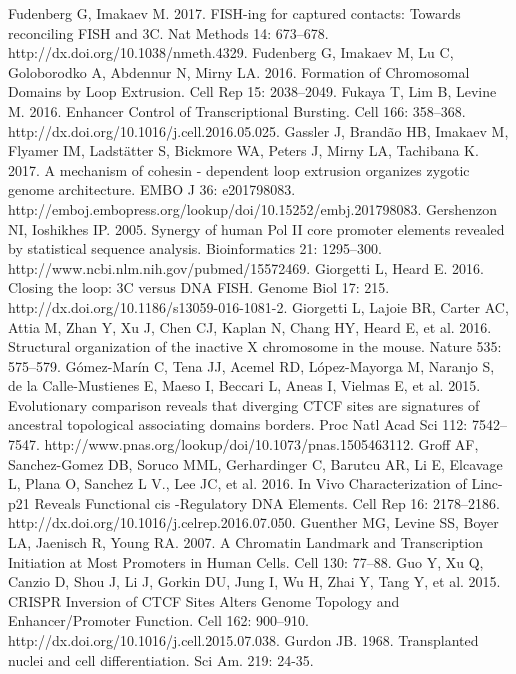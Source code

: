\begin{thebibliography}{1}
	 Fudenberg G, Imakaev M. 2017. FISH-ing for captured contacts: Towards reconciling FISH and 3C. Nat Methods 14: 673–678. http://dx.doi.org/10.1038/nmeth.4329.
	 Fudenberg G, Imakaev M, Lu C, Goloborodko A, Abdennur N, Mirny LA. 2016. Formation of Chromosomal Domains by Loop Extrusion. Cell Rep 15: 2038–2049.
	 Fukaya T, Lim B, Levine M. 2016. Enhancer Control of Transcriptional Bursting. Cell 166: 358–368. http://dx.doi.org/10.1016/j.cell.2016.05.025.
	 Gassler J, Brandão HB, Imakaev M, Flyamer IM, Ladstätter S, Bickmore WA, Peters J, Mirny LA, Tachibana K. 2017. A mechanism of cohesin - dependent loop extrusion organizes zygotic genome architecture. EMBO J 36: e201798083. http://emboj.embopress.org/lookup/doi/10.15252/embj.201798083.
	 Gershenzon NI, Ioshikhes IP. 2005. Synergy of human Pol II core promoter elements revealed by statistical sequence analysis. Bioinformatics 21: 1295–300. http://www.ncbi.nlm.nih.gov/pubmed/15572469.
	 Giorgetti L, Heard E. 2016. Closing the loop: 3C versus DNA FISH. Genome Biol 17: 215. http://dx.doi.org/10.1186/s13059-016-1081-2.
	 Giorgetti L, Lajoie BR, Carter AC, Attia M, Zhan Y, Xu J, Chen CJ, Kaplan N, Chang HY, Heard E, et al. 2016. Structural organization of the inactive X chromosome in the mouse. Nature 535: 575–579.
	 Gómez-Marín C, Tena JJ, Acemel RD, López-Mayorga M, Naranjo S, de la Calle-Mustienes E, Maeso I, Beccari L, Aneas I, Vielmas E, et al. 2015. Evolutionary comparison reveals that diverging CTCF sites are signatures of ancestral topological associating domains borders. Proc Natl Acad Sci 112: 7542–7547. http://www.pnas.org/lookup/doi/10.1073/pnas.1505463112.
	 Groff AF, Sanchez-Gomez DB, Soruco MML, Gerhardinger C, Barutcu AR, Li E, Elcavage L, Plana O, Sanchez L V., Lee JC, et al. 2016. In Vivo Characterization of Linc-p21 Reveals Functional cis -Regulatory DNA Elements. Cell Rep 16: 2178–2186. http://dx.doi.org/10.1016/j.celrep.2016.07.050.
	 Guenther MG, Levine SS, Boyer LA, Jaenisch R, Young RA. 2007. A Chromatin Landmark and Transcription Initiation at Most Promoters in Human Cells. Cell 130: 77–88.
	 Guo Y, Xu Q, Canzio D, Shou J, Li J, Gorkin DU, Jung I, Wu H, Zhai Y, Tang Y, et al. 2015. CRISPR Inversion of CTCF Sites Alters Genome Topology and Enhancer/Promoter Function. Cell 162: 900–910. http://dx.doi.org/10.1016/j.cell.2015.07.038.
	 Gurdon JB. 1968. Transplanted nuclei and cell differentiation. Sci Am. 219: 24-35.

\end{thebibliography}
